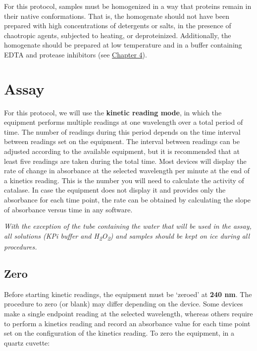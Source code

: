 \documentclass[
  9pt,
  american,
  a5paper,
  extrafontsizes,onecolumn,openright
  ]{memoir}
\newlength{\rf}
\begin{document}
For this protocol, samples must be homogenized in a way that proteins remain in their native conformations. That is, the homogenate should not have been prepared with high concentrations of detergents or salts, in the presence of chaotropic agents, subjected to heating, or deproteinized. Additionally, the homogenate should be prepared at low temperature and in a buffer containing EDTA and protease inhibitors (see \hyperref[chapter4]{Chapter 4}).

\section{Assay}\label{assay_general}

For this protocol, we will use the \textbf{kinetic reading mode}, in which the equipment performs multiple readings at one wavelength over a total period of time. The number of readings during this period depends on the time interval between readings set on the equipment. The interval between readings can be adjusted according to the available equipment, but it is recommended that at least five readings are taken during the total time. Most devices will display the rate of change in absorbance at the selected wavelength per minute at the end of a kinetics reading. This is the number you will need to calculate the activity of catalase. In case the equipment does not display it and provides only the absorbance for each time point, the rate can be obtained by calculating the slope of absorbance versus time in any software.

\begin{greybox}[frametitle = Note]
\emph{With the exception of the tube containing the water that will be used in the assay, all solutions (KPi buffer and H\textsubscript{2}O\textsubscript{2}) and samples should be kept on ice during all procedures.}

\end{greybox}

\subsection{Zero}\label{cat_zero}

Before starting kinetic readings, the equipment must be \enquote*{zeroed} at \textbf{240 nm}. The procedure to zero (or blank) may differ depending on the device. Some devices make a single endpoint reading at the selected wavelength, whereas others require to perform a kinetics reading and record an absorbance value for each time point set on the configuration of the kinetics reading. To zero the equipment, in a quartz cuvette:
\end{document}
